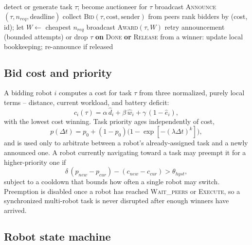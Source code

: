 \documentclass[conference]{IEEEtran}
\begin{document}
\begin{algorithm}[t]
\caption{Auction lifecycle (auctioneer view)}
\label{alg:auction}
\begin{algorithmic}[1]
\State detect or generate task $\tau$; become auctioneer for $\tau$
\State broadcast \textsc{Announce}$(\tau, n_{req}, \text{deadline})$
  \State collect \textsc{Bid}$(\tau, \text{cost}, \text{sender})$ from peers
\EndWhile
\State rank bidders by (cost, id); let $W\gets$ cheapest $n_{req}$
  \State broadcast \textsc{Award}$(\tau, W)$
\Else
  \State retry announcement (bounded attempts) or drop $\tau$
\EndIf
\State \textbf{on} \textsc{Done} \textbf{or} \textsc{Release} from a winner: update local bookkeeping; re-announce if released
\end{algorithmic}
\end{algorithm}

\subsection{Bid cost and priority}

A bidding robot $i$ computes a cost for task $\tau$ from three normalized,
purely local terms -- distance, current workload, and battery deficit:
\begin{equation}
c_i(\tau)=\alpha\,\hat{d}_i+\beta\,\hat{w}_i+\gamma\,(1-\hat{e}_i),
\label{eq:cost}
\end{equation}
with the lowest cost winning. Task priority ages independently of cost,
\begin{equation}
p(\Delta t)=p_0+(1-p_0)\bigl(1-\exp[-(\lambda\Delta t)^k]\bigr),
\label{eq:priority}
\end{equation}
and is used only to arbitrate between a robot's already-assigned task and
a newly announced one. A robot currently navigating toward a task may
preempt it for a higher-priority one if
\begin{equation}
\delta\,(p_{new}-p_{cur})-(c_{new}-c_{cur})>\theta_{hyst},
\label{eq:preempt}
\end{equation}
subject to a cooldown that bounds how often a single robot may switch.
Preemption is disabled once a robot has reached \textsc{Wait\_peers} or
\textsc{Execute}, so a synchronized multi-robot task is never disrupted
after enough winners have arrived.

\subsection{Robot state machine}
\end{document}
